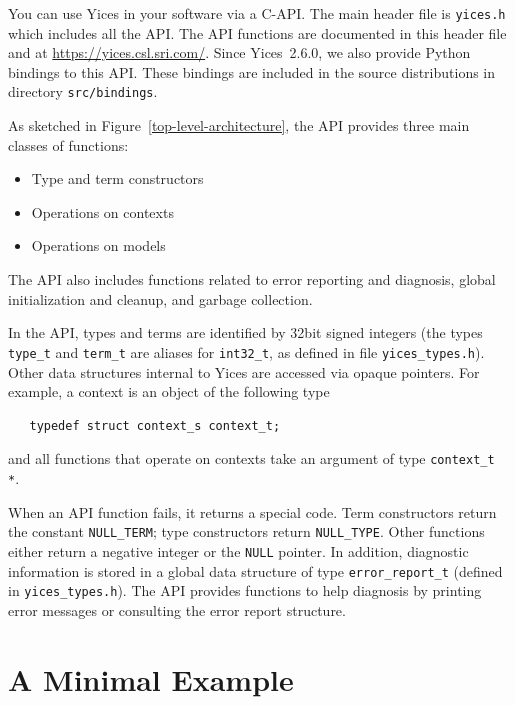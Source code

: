 \documentclass[11pt,twoside,fleqn,openright,titlepage]{cslreport}
\begin{document}
You can use Yices in your software via a C-API. The main header file
is \texttt{yices.h} which includes all the API. The API functions are
documented in this header file and at
\url{https://yices.csl.sri.com/}. Since Yices~2.6.0, we also provide
Python bindings to this API. These bindings are included in the source
distributions in directory \texttt{src/bindings}.

\medskip\noindent
As sketched in Figure~\ref{top-level-architecture}, the API provides
three main classes of functions:
\begin{itemize}
\item Type and term constructors
\item Operations on contexts
\item Operations on models
\end{itemize}
The API also includes functions related to error reporting and
diagnosis, global initialization and cleanup, and garbage collection.

\medskip\noindent
In the API, types and terms are identified by 32bit signed integers
(the types \texttt{type\_t} and \texttt{term\_t} are aliases for
\texttt{int32\_t}, as defined in file \texttt{yices\_types.h}). Other
data structures internal to Yices are accessed via opaque
pointers. For example, a context is an object of the following type
\begin{small}
\begin{verbatim}
   typedef struct context_s context_t;
\end{verbatim}
\end{small}
and all functions that operate on contexts take an argument of type
\texttt{context\_t *}.

\medskip\noindent
When an API function fails, it returns a special code. Term
constructors return the constant \texttt{NULL\_TERM}; type
constructors return \texttt{NULL\_TYPE}. Other functions either return
a negative integer or the \texttt{NULL} pointer. In addition,
diagnostic information is stored in a global data structure of type
\texttt{error\_report\_t} (defined in \texttt{yices\_types.h}). The API
provides functions to help diagnosis by printing error messages or
consulting the error report structure.


\section{A Minimal Example}
\end{document}

